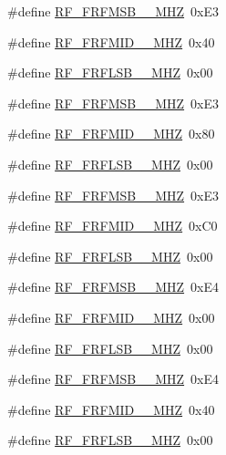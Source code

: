 \begin{DoxyCompactItemize}
\item 
\#define \hyperlink{sx1276Regs-Fsk_8h_aa30208849f839f0bd46fa5bcce4a1b4d}{R\+F\+\_\+\+F\+R\+F\+M\+S\+B\+\_\+\_\+\+M\+HZ}~0x\+E3
\item 
\#define \hyperlink{sx1276Regs-Fsk_8h_a0f2dfb97900c562d6097dc14bed35164}{R\+F\+\_\+\+F\+R\+F\+M\+I\+D\+\_\+\_\+\+M\+HZ}~0x40
\item 
\#define \hyperlink{sx1276Regs-Fsk_8h_a7cae9ceaac8f2c67896fae0f48307539}{R\+F\+\_\+\+F\+R\+F\+L\+S\+B\+\_\+\_\+\+M\+HZ}~0x00
\item 
\#define \hyperlink{sx1276Regs-Fsk_8h_ab768211f38db9d1409de34ae1a4e07ae}{R\+F\+\_\+\+F\+R\+F\+M\+S\+B\+\_\+\_\+\+M\+HZ}~0x\+E3
\item 
\#define \hyperlink{sx1276Regs-Fsk_8h_a3602c77fb8c46ec1aa8c8bc23455181d}{R\+F\+\_\+\+F\+R\+F\+M\+I\+D\+\_\+\_\+\+M\+HZ}~0x80
\item 
\#define \hyperlink{sx1276Regs-Fsk_8h_a480899d8b9136ea63dc5382d206def71}{R\+F\+\_\+\+F\+R\+F\+L\+S\+B\+\_\+\_\+\+M\+HZ}~0x00
\item 
\#define \hyperlink{sx1276Regs-Fsk_8h_a7dca7fbccfb186de24ab3c46a1a2d70b}{R\+F\+\_\+\+F\+R\+F\+M\+S\+B\+\_\+\_\+\+M\+HZ}~0x\+E3
\item 
\#define \hyperlink{sx1276Regs-Fsk_8h_abbadaaee53f7f5a47b4d7e06efe12f5b}{R\+F\+\_\+\+F\+R\+F\+M\+I\+D\+\_\+\_\+\+M\+HZ}~0x\+C0
\item 
\#define \hyperlink{sx1276Regs-Fsk_8h_ab6ba47c7782eb528dc506a3af1c8792b}{R\+F\+\_\+\+F\+R\+F\+L\+S\+B\+\_\+\_\+\+M\+HZ}~0x00
\item 
\#define \hyperlink{sx1276Regs-Fsk_8h_a8a8c4525592e8d79144da83beaf3bda8}{R\+F\+\_\+\+F\+R\+F\+M\+S\+B\+\_\+\_\+\+M\+HZ}~0x\+E4
\item 
\#define \hyperlink{sx1276Regs-Fsk_8h_ad0aa8be155a01fea5b88cf0f0973f93b}{R\+F\+\_\+\+F\+R\+F\+M\+I\+D\+\_\+\_\+\+M\+HZ}~0x00
\item 
\#define \hyperlink{sx1276Regs-Fsk_8h_a0a5d15119dbdf4aefbc6c11d65c2b360}{R\+F\+\_\+\+F\+R\+F\+L\+S\+B\+\_\+\_\+\+M\+HZ}~0x00
\item 
\#define \hyperlink{sx1276Regs-Fsk_8h_aed868e22bd165fab920c66816c665033}{R\+F\+\_\+\+F\+R\+F\+M\+S\+B\+\_\+\_\+\+M\+HZ}~0x\+E4
\item 
\#define \hyperlink{sx1276Regs-Fsk_8h_aa6875f66924d31b915390903c1fab25a}{R\+F\+\_\+\+F\+R\+F\+M\+I\+D\+\_\+\_\+\+M\+HZ}~0x40
\item 
\#define \hyperlink{sx1276Regs-Fsk_8h_a007ff670a860ed0968e2022a303bcaf5}{R\+F\+\_\+\+F\+R\+F\+L\+S\+B\+\_\+\_\+\+M\+HZ}~0x00

\end{DoxyCompactItemize}
